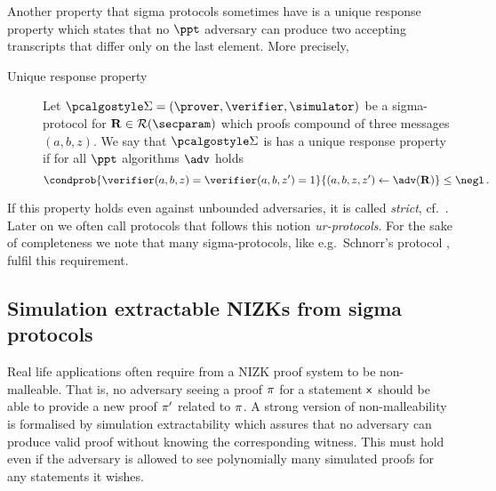 \let\accentvec\vec \documentclass[runningheads,10pt]{llncs}
\begin{document}
Another property that sigma protocols sometimes have is a unique response property \cite{C:Fischlin05} which states that no
$\ppt$ adversary  can produce two accepting transcripts that differ only on
the last element.  More precisely,
\begin{description}
	\item[Unique response property] Let $\sigmaprot = (\prover, \verifier,
			\simulator)$ be a sigma-protocol for $\REL \in \RELGEN(\secparam)$ which
			proofs compound of three messages $(a, b, z)$. We say that
			$\sigmaprot$ is has a unique response property if for all $\ppt$
			algorithms $\adv$ holds 
			\[
				\condprob{\verifier (a, b, z) = \verifier (a, b, z')  = 1}{(a, b, z,
				z') \gets \adv(\REL)} \leq \negl\,.
			\]
\end{description}
If this property holds even against unbounded adversaries, it is called \emph{strict}, cf.~\cite{INDOCRYPT:FKMV12}.
Later on we often call protocols that follows this notion \emph{ur-protocols}.
For the sake of completeness we note that many sigma-protocols, like e.g.~Schnorr's protocol \cite{C:Schnorr89}, fulfil this requirement.


\subsection{Simulation extractable NIZKs from sigma protocols}
Real life applications often require from a NIZK proof system to be
non-malleable. That is, no adversary seeing a proof $\pi$ for a statement
$\mathsf{x}$ should be able to provide a new proof $\pi'$ related to
$\pi$.  A strong version of non-malleability is formalised by simulation
extractability which assures that no adversary can produce valid proof
without knowing the corresponding witness. This must hold even if the
adversary is allowed to see polynomially many simulated proofs for any
statements it wishes.
\end{document}
